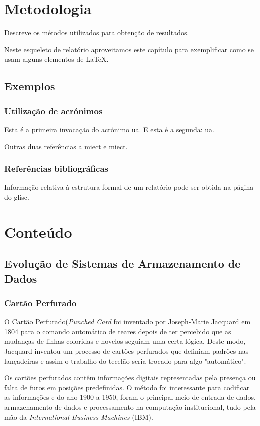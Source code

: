 \documentclass{report}
\begin{document}
\chapter{Metodologia}
\label{chap.metodologia}
Descreve os métodos utilizados para obtenção de resultados.

Neste esqueleto de relatório aproveitamos este capítulo para exemplificar
como se usam alguns elementos de {\LaTeX}.

\section{Exemplos}

\subsection{Utilização de acrónimos}
Esta é a primeira invocação do acrónimo \ac{ua}.
E esta é a segunda: \ac{ua}.

Outras duas referências a \ac{miect}
e \ac{miect}.

\subsection{Referências bibliográficas}
Informação relativa à estrutura formal de um relatório pode ser obtida
na página do \ac{glisc}\cite{glisc}.

\newpage
\chapter{Conteúdo}
\label{chap.conteúdo}
	\section{Evolução de Sistemas de Armazenamento de Dados}
		\subsection{Cartão Perfurado}
		O Cartão Perfurado(\textit{Punched Card} foi inventado por Joseph-Marie Jacquard em 1804 para o comando automático de teares depois de ter percebido que as mudanças de linhas coloridas e novelos  seguiam uma certa lógica. Deste modo, Jacquard inventou um processo de cartões perfurados que definiam padrões nas lançadeiras e assim o trabalho do tecelão seria trocado para algo "automático". 
\vspace{1mm}
		
		Os cartões perfurados contêm informações digitais representadas pela presença ou falta de furos em posições predefinidas. O método foi interessante para codificar as informações e do ano 1900 a 1950, foram o principal meio de entrada de dados, armazenamento de dados e processamento na computação institucional, tudo pela mão da \textit{International Business Machines} (IBM). 
		
\end{document}
